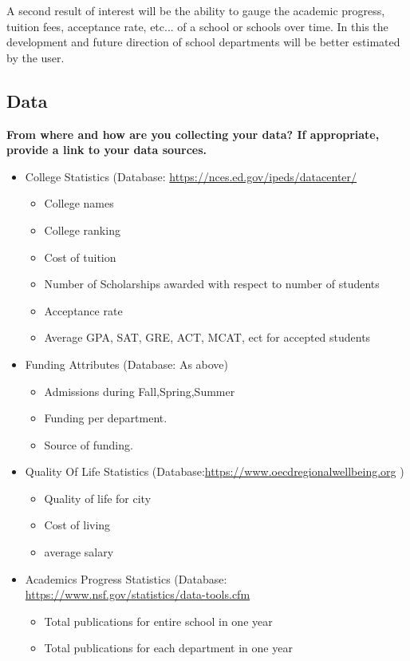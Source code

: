 \documentclass[11pt, a4paper]{article}
\begin{document}
A second result of interest will be the ability to gauge the academic progress, tuition fees, acceptance rate, etc... of a school or schools over time. In this the development and future direction of school departments will be better estimated by the user. 

\subsection{Data}\textbf{ From where and how are you collecting your data? If appropriate, provide a link to your data sources.}

\begin{itemize}
  \setlength\itemsep{0.5em}
\item College Statistics (Database: \href{https://nces.ed.gov/ipeds/datacenter/}{https://nces.ed.gov/ipeds/datacenter/}
  \begin{itemize}
\item College names
\item College ranking
\item Cost of tuition
\item Number of Scholarships awarded with respect to number of students
\item Acceptance rate
\item Average GPA, SAT, GRE, ACT, MCAT, ect for accepted students
\end{itemize}
\item Funding Attributes (Database: As above)
  \begin{itemize}
\item Admissions during Fall,Spring,Summer
\item Funding per department.
\item Source of funding.
\end{itemize}
\item Quality Of Life Statistics (Database:\href{https://www.oecdregionalwellbeing.org}{https://www.oecdregionalwellbeing.org} )
  \begin{itemize}
\item Quality of life for city
\item Cost of living
\item average salary
\end{itemize}
\item Academics Progress Statistics (Database: \href{https://www.nsf.gov/statistics/data-tools.cfm}{https://www.nsf.gov/statistics/data-tools.cfm}
  \begin{itemize}
  \item Total publications for entire school in one year
  \item Total publications for each department in one year
    \end{itemize}
\end{itemize}
\end{document}
